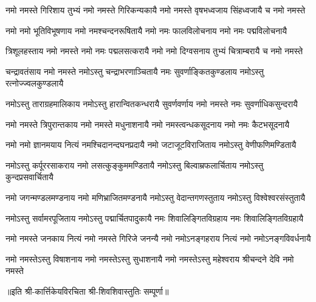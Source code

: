 
\begin{AutoCols}[\maxColumns]
\fourlineindentedshloka
{नमो नमस्ते गिरिशाय तुभ्यं}
{नमो नमस्ते गिरिकन्यकायै}
{नमो नमस्ते वृषभध्वजाय}
{सिंहध्वजायै च नमो नमस्ते}

\fourlineindentedshloka
{नमो नमो भूतिविभूषणाय}
{नमो नमश्चन्दनरूषितायै}
{नमो नमः फालविलोचनाय}
{नमो नमः पद्मविलोचनायै}

\fourlineindentedshloka
{त्रिशूलहस्ताय नमो नमस्ते}
{नमो नमः पद्मलसत्करायै}
{नमो नमो दिग्वसनाय तुभ्यं}
{चित्राम्बरायै च नमो नमस्ते}

\fourlineindentedshloka
{चन्द्रावतंसाय नमो नमस्ते}
{नमोऽस्तु चन्द्राभरणाञ्चितायै}
{नमः सुवर्णाङ्कितकुण्डलाय}
{नमोऽस्तु रत्नोज्ज्वलकुण्डलायै}

\fourlineindentedshloka
{नमोऽस्तु ताराग्रहमालिकाय}
{नमोऽस्तु हारान्वितकन्धरायै}
{सुवर्णवर्णाय नमो नमस्ते}
{नमः सुवर्णाधिकसुन्दरायै}

\fourlineindentedshloka
{नमो नमस्ते त्रिपुरान्तकाय}
{नमो नमस्ते मधुनाशनायै}
{नमो नमस्त्वन्धकसूदनाय}
{नमो नमः कैटभसूदनायै}

\fourlineindentedshloka
{नमो नमो ज्ञानमयाय नित्यं}
{नमश्चिदानन्दघनप्रदायै}
{नमो जटाजूटविराजिताय}
{नमोऽस्तु वेणीफणिमण्डितायै}

\fourlineindentedshloka
{नमोऽस्तु कर्पूररसाकराय}
{नमो लसत्कुङ्कुममण्डितायै}
{नमोऽस्तु बिल्वाम्रफलार्चिताय}
{नमोऽस्तु कुन्दप्रसवार्चितायै}

\fourlineindentedshloka
{नमो जगन्मण्डलमण्डनाय}
{नमो मणिभ्राजितमण्डनायै}
{नमोऽस्तु वेदान्तगणस्तुताय}
{नमोऽस्तु विश्वेश्वरसंस्तुतायै}

\fourlineindentedshloka
{नमोऽस्तु सर्वामरपूजिताय}
{नमोऽस्तु पद्मार्चितपादुकायै}
{नमः शिवालिङ्गितविग्रहाय}
{नमः शिवालिङ्गितविग्रहायै}

\fourlineindentedshloka
{नमो नमस्ते जनकाय नित्यं}
{नमो नमस्ते गिरिजे जनन्यै}
{नमो नमोऽनङ्गहराय नित्यं}
{नमो नमोऽनङ्गविवर्धनायै}

\fourlineindentedshloka
{नमो नमस्तेऽस्तु विषाशनाय}
{नमो नमस्तेऽस्तु सुधाशनायै}
{नमो नमस्तेऽस्तु महेश्वराय}
{श्रीचन्दने देवि नमो नमस्ते}
\end{AutoCols}
॥इति श्री-कार्त्तिकेयविरचिता श्री-शिवशिवास्तुतिः सम्पूर्णा॥